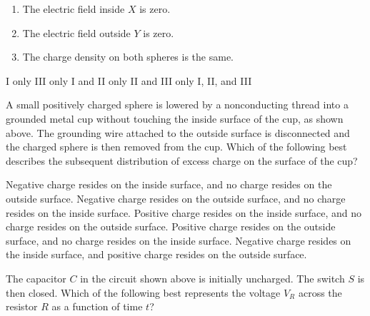 \documentclass[12pt]{../oss-classkick-exam}
\begin{document}
\begin{questions}
  \begin{enumerate}[nosep,label=\Roman*.]
  \item The electric field inside $X$ is zero.
  \item The electric field outside $Y$ is zero.
  \item The charge density on both spheres is the same.
  \end{enumerate}

  \vspace{.2in}\begin{choices}
    \choice I only
    \choice III only
    \choice I and II only
    \choice II and III only
    \choice I, II, and III
  \end{choices}


  \question A small positively charged sphere is lowered by a nonconducting
  thread into a grounded metal cup without touching the inside surface of the
  cup, as shown above. The grounding wire attached to the outside surface is
  disconnected and the charged sphere is then removed from the cup. Which of
  the following best describes the subsequent distribution of excess charge on
  the surface of the cup?
  \begin{choices}
    \choice Negative charge resides on the inside surface, and no charge
    resides on the outside surface.
    \choice Negative charge resides on the outside surface, and no charge
    resides on the inside surface.
    \choice Positive charge resides on the inside surface, and no charge
    resides on the outside surface.
    \choice Positive charge resides on the outside surface, and no charge
    resides on the inside surface.
    \choice Negative charge resides on the inside surface, and positive charge
    resides on the outside surface.
  \end{choices}
  \vspace{.6in}
  
  \question The capacitor $C$ in the circuit shown above is initially
  uncharged. The switch $S$ is then closed. Which of the following best
  represents the voltage $V_R$ across the resistor $R$ as a function of time
  $t$?
  

\end{questions}
\end{document}
